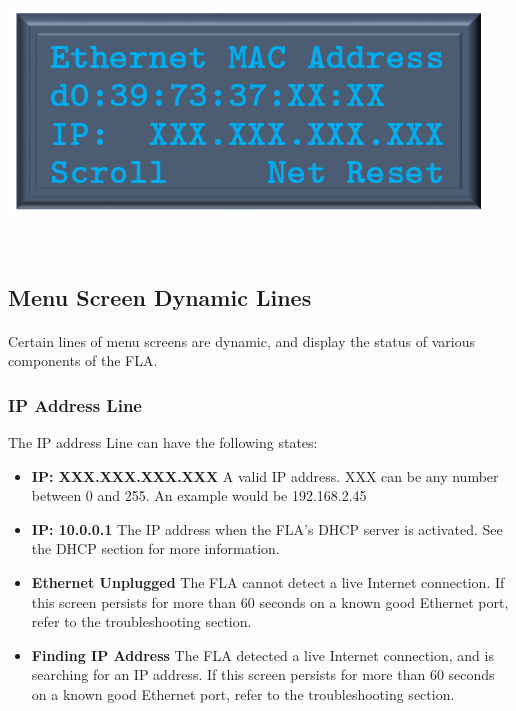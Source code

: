 \documentclass[11pt, oneside]{book}
\begin{document}
\hfill%
\begin{minipage}{0.45\textwidth} 
	\includegraphics[width=\linewidth]{../media/pstricks_files/11_ethernet_mac}
\end{minipage}\\[\baselineskip]


\subsection{Menu Screen Dynamic Lines}
\paragraph{  }
Certain lines of menu screens are dynamic, and display the status
of various components of the FLA.

\subsubsection{IP Address Line}

The IP address Line can have the following states:
\begin{itemize}
\item \textbf{IP: XXX.XXX.XXX.XXX} A valid IP address. XXX can be any number
between 0 and 255. An example would be 192.168.2.45
\item \textbf{IP: 10.0.0.1} The IP address when the FLA's DHCP server is activated.
See the DHCP section for more information.
\item \textbf{Ethernet Unplugged} The FLA cannot detect a live Internet connection.
If this screen persists for more than 60 seconds on a known good Ethernet
port, refer to the troubleshooting section.
\item \textbf{Finding IP Address} The FLA detected a live Internet connection,
and is searching for an IP address. If this screen persists for more
than 60 seconds on a known good Ethernet port, refer to the troubleshooting
section.
\end{itemize}
\end{document}
